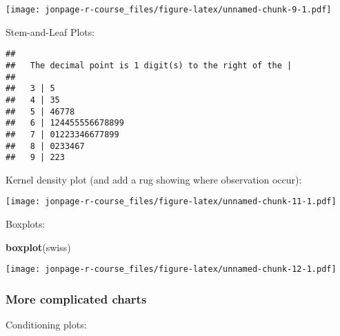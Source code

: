 \documentclass[]{book}
\newenvironment{Shaded}{\begin{snugshade}}{\end{snugshade}}
\newcommand{\KeywordTok}[1]{\textcolor[rgb]{0.13,0.29,0.53}{\textbf{{#1}}}}
\newcommand{\DecValTok}[1]{\textcolor[rgb]{0.00,0.00,0.81}{{#1}}}
\newcommand{\StringTok}[1]{\textcolor[rgb]{0.31,0.60,0.02}{{#1}}}
\newcommand{\NormalTok}[1]{{#1}}
\theoremstyle{definition}
\theoremstyle{definition}
\theoremstyle{remark}
\begin{document}
\begin{Shaded}
\end{Shaded}

\texttt{[image: jonpage-r-course\_files/figure-latex/unnamed-chunk-9-1.pdf]}

Stem-and-Leaf Plots:

\begin{Shaded}
\end{Shaded}

\begin{verbatim}
## 
##   The decimal point is 1 digit(s) to the right of the |
## 
##   3 | 5
##   4 | 35
##   5 | 46778
##   6 | 124455556678899
##   7 | 01223346677899
##   8 | 0233467
##   9 | 223
\end{verbatim}

Kernel density plot (and add a rug showing where observation occur):

\begin{Shaded}
\end{Shaded}

\texttt{[image: jonpage-r-course\_files/figure-latex/unnamed-chunk-11-1.pdf]}

Boxplots:

\begin{Shaded}
\begin{Highlighting}[]
\KeywordTok{boxplot}\NormalTok{(swiss)}
\end{Highlighting}
\end{Shaded}

\texttt{[image: jonpage-r-course\_files/figure-latex/unnamed-chunk-12-1.pdf]}

\subsubsection{More complicated charts}\label{more-complicated-charts}

Conditioning plots:

\begin{Shaded}
\end{Shaded}
\end{document}
